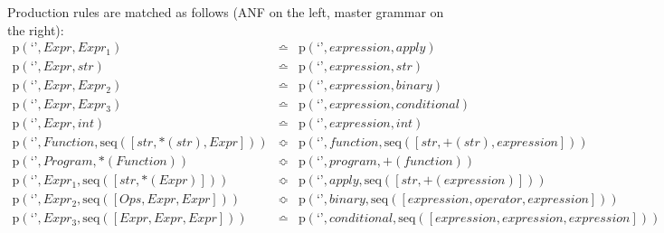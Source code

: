 Production rules are matched as follows (ANF on the left, master grammar on the right):
\begin{eqnarray*}
\mathrm{p}\left(\text{`'},\mathit{Expr},\mathit{Expr_1}\right) & \bumpeq & \mathrm{p}\left(\text{`'},\mathit{expression},\mathit{apply}\right) \\
\mathrm{p}\left(\text{`'},\mathit{Expr},str\right) & \bumpeq & \mathrm{p}\left(\text{`'},\mathit{expression},str\right) \\
\mathrm{p}\left(\text{`'},\mathit{Expr},\mathit{Expr_2}\right) & \bumpeq & \mathrm{p}\left(\text{`'},\mathit{expression},\mathit{binary}\right) \\
\mathrm{p}\left(\text{`'},\mathit{Expr},\mathit{Expr_3}\right) & \bumpeq & \mathrm{p}\left(\text{`'},\mathit{expression},\mathit{conditional}\right) \\
\mathrm{p}\left(\text{`'},\mathit{Expr},int\right) & \bumpeq & \mathrm{p}\left(\text{`'},\mathit{expression},int\right) \\
\mathrm{p}\left(\text{`'},\mathit{Function},\mathrm{seq}\left(\left[str, {*}\left(str\right), \mathit{Expr}\right]\right)\right) & \Bumpeq & \mathrm{p}\left(\text{`'},\mathit{function},\mathrm{seq}\left(\left[str, {+}\left(str\right), \mathit{expression}\right]\right)\right) \\
\mathrm{p}\left(\text{`'},\mathit{Program},{*}\left(\mathit{Function}\right)\right) & \Bumpeq & \mathrm{p}\left(\text{`'},\mathit{program},{+}\left(\mathit{function}\right)\right) \\
\mathrm{p}\left(\text{`'},\mathit{Expr_1},\mathrm{seq}\left(\left[str, {*}\left(\mathit{Expr}\right)\right]\right)\right) & \Bumpeq & \mathrm{p}\left(\text{`'},\mathit{apply},\mathrm{seq}\left(\left[str, {+}\left(\mathit{expression}\right)\right]\right)\right) \\
\mathrm{p}\left(\text{`'},\mathit{Expr_2},\mathrm{seq}\left(\left[\mathit{Ops}, \mathit{Expr}, \mathit{Expr}\right]\right)\right) & \Bumpeq & \mathrm{p}\left(\text{`'},\mathit{binary},\mathrm{seq}\left(\left[\mathit{expression}, \mathit{operator}, \mathit{expression}\right]\right)\right) \\
\mathrm{p}\left(\text{`'},\mathit{Expr_3},\mathrm{seq}\left(\left[\mathit{Expr}, \mathit{Expr}, \mathit{Expr}\right]\right)\right) & \bumpeq & \mathrm{p}\left(\text{`'},\mathit{conditional},\mathrm{seq}\left(\left[\mathit{expression}, \mathit{expression}, \mathit{expression}\right]\right)\right) \\
\end{eqnarray*}
